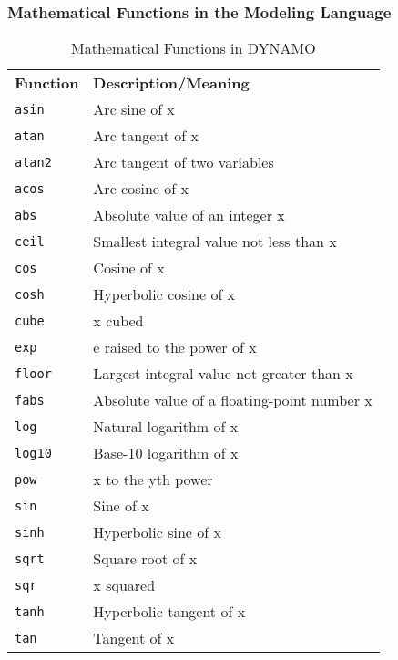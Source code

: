 \newpage
\subsubsection{Mathematical Functions in the Modeling Language}
\label{Mathematical Functions in the System Description Language}

\begin{table}[htdp]
\caption{Mathematical Functions in DYNAMO}
\begin{center}
\vspace{.5cm}
\begin{tabular}{ll}
 \textbf{Function} & \textbf{Description/Meaning}\\

     \texttt{asin}      & Arc sine of x \\
     \texttt{atan}      & Arc tangent of x\\
     \texttt{atan2}     & Arc tangent of two variables\\
     \texttt{acos}      & Arc cosine of x\\
     \texttt{abs}       & Absolute value of an integer x\\
     \texttt{ceil}      & Smallest integral value not less than x\\
     \texttt{cos}       & Cosine of x\\
     \texttt{cosh}      & Hyperbolic cosine of x\\
     \texttt{cube}      & x cubed\\
     \texttt{exp}       & e raised to the power of x\\
     \texttt{floor}     & Largest integral value not greater than x\\
     \texttt{fabs}      & Absolute value of a floating-point number x\\
     \texttt{log}       & Natural logarithm of x\\
     \texttt{log10}     & Base-10 logarithm of x\\
     \texttt{pow}       & x to the yth power\\
     \texttt{sin}       & Sine of x\\
     \texttt{sinh}      & Hyperbolic sine of x\\
     \texttt{sqrt}      & Square root of x\\
     \texttt{sqr}       & x squared\\
     \texttt{tanh}      & Hyperbolic tangent of x\\
     \texttt{tan}       & Tangent of x\\

\end{tabular}
\end{center}
\label{default}
\end{table}%

